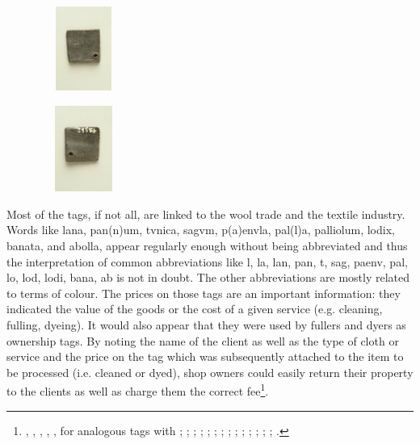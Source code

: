 \documentclass[amsthm,ebook]{saparticle}
\begin{document}
\begin{figure}
\centering
\includegraphics[width=2.944cm,height=2.752cm]{EAGLE16lameetalteaching-img001.jpg}
\end{figure}
\begin{figure}
\centering
\includegraphics[width=2.944cm,height=2.82cm]{EAGLE16lameetalteaching-img002.jpg}
\end{figure}
Most of the tags, if not all, are linked to the wool trade and the textile industry. Words like lana, pan(n)um, tvnica,
sagvm, p(a)envla, pal(l)a, palliolum, lodix, banata, and abolla, appear regularly enough without being abbreviated and
thus the interpretation of common abbreviations like l, la, lan, pan, t, sag, paenv, pal, lo, lod, lodi, bana, ab is
not in doubt. The other abbreviations are mostly related to terms of colour. The prices on those tags are an important
information: they indicated the value of the goods or the cost of a given service (e.g. cleaning, fulling, dyeing). It
would also appear that they were used by fullers and dyers as ownership tags. By noting the name of the client as well
as the type of cloth or service and the price on the tag which was subsequently attached to the item to be processed
(i.e. cleaned or dyed), shop owners could easily return their property to the clients as well as charge them the
correct fee\footnote{\citep{radman_livaja_segestica..._2008}, \citep{radman-livaja_roetiquettes_2010}, \citep{radman-livaja_5._2013}, \citep[165-172]{radman-livaja_two_2013}, \citep{radman-livaja_plombs_2014},  for analogous tags with \citep[97-104]{mocsy_olom_1956}; \citep[195-210]{egger_funf_1968}; \citep[127-138]{frei-stolba_les_2011}; \citep[121-137/93, 215-222]{schwinden_romerzeitliche_1985}; \citep{romer-martijnse_romerzeitliche_1990}; \citep[5-48]{romer-martijnse_fruhkaiserzeitliche_1997}; \citep[301-305]{feugere_etiquette_1993}; \citep[211-220]{weiss_bleietiketten_1991}; \citep[29-40]{paci_etichette_1995}; \citep[207-216]{bassi_tre_1996}; \citep[121-135]{bizzarini_quattro_2005}; \citep[43-51]{buchi_etichette_2005}; \citep[42-110]{cresci_supellex_2010}; \citep[295-317]{jacques_artisanat_2010}; \citep[237-246]{wedenig_bleietikett_2013}.}. 
\end{document}
